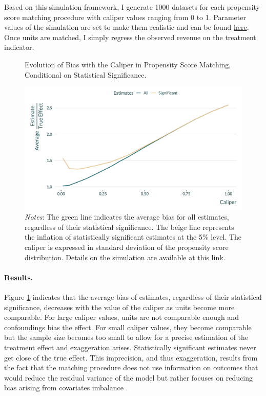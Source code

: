 \documentclass[usletter, 12pt]{article}
\begin{document}
        		Based on this simulation framework, I generate 1000 datasets for each propensity score matching procedure with caliper values ranging from 0 to 1. Parameter values of the simulation are set to make them realistic and can be found \href{https://vincentbagilet.github.io/causal_exaggeration/Matching.html}{here}. Once units are matched, I simply regress the observed revenue on the treatment indicator.
        
         \begin{figure}[!h] 
			    \caption{Evolution of Bias with the Caliper in Propensity Score Matching, Conditional on Statistical Significance.}
				\label{graph_matching}
			 \centering\includegraphics[width=0.8\linewidth]{images/main_graph_matching_paper.pdf}
			 \caption*{\footnotesize \textit{Notes}: The green line indicates the average bias for all estimates, regardless of their statistical significance. The beige line represents the inflation of statistically significant estimates at the 5\% level. The caliper is expressed in standard deviation of the propensity score distribution. Details on the simulation are available at this \href{https://vincentbagilet.github.io/causal_exaggeration/Matching.html}{link}.}
		\end{figure} 
        
        \paragraph{Results.} Figure \ref{graph_matching} indicates that the average bias of estimates, regardless of their statistical significance, decreases with the value of the caliper as units become more comparable. For large caliper values, units are not comparable enough and confoundings bias the effect. For small caliper values, they become comparable but the sample size becomes too small to allow for a precise estimation of the treatment effect and exaggeration arises. Statistically significant estimates never get close of the true effect. This imprecision, and thus exaggeration, results from the fact that the matching procedure does not use information on outcomes that would reduce the residual variance of the model but rather focuses on reducing bias arising from covariates imbalance \citep{rubin_using_2001}. 

		
\end{document}
